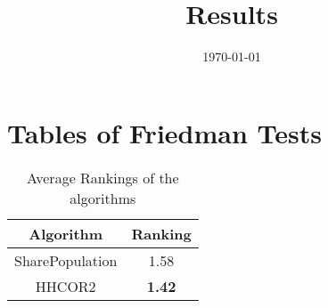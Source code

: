 \documentclass{article}
\title{Results}
\author{}
\date{\today}
\begin{document}
\oddsidemargin 0in \topmargin 0in\maketitle
\section{Tables of Friedman Tests}
\begin{table}[!htp]
\centering
\caption{Average Rankings of the algorithms
}\begin{tabular}{|c|c|}
\hline
Algorithm&Ranking\\
\hline
SharePopulation&1.58\\\hline
HHCOR2& {\bf 1.42}\\\hline
\end{tabular}
\end{table}
\end{document}
